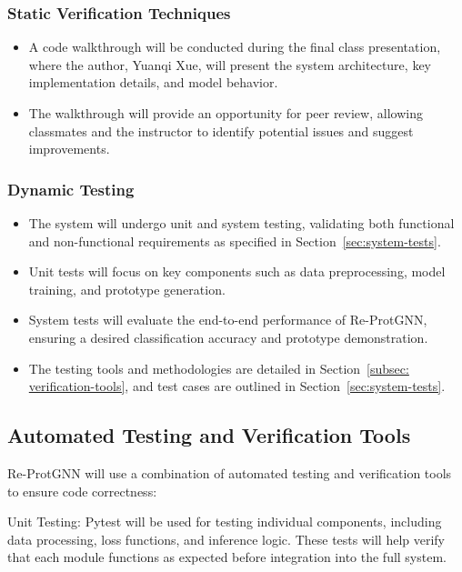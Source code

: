 \documentclass[12pt, titlepage]{article}
\begin{document}
\subsubsection{Static Verification Techniques} 
    \begin{itemize} 
    \item A code walkthrough will be conducted during the final class presentation, where the author, Yuanqi Xue, will present the system architecture, key implementation details, and model behavior.
    
    \item The walkthrough will provide an opportunity for peer review, allowing classmates and the instructor to identify potential issues and suggest improvements. 

\end{itemize}

\subsubsection{Dynamic Testing} 
\begin{itemize} 
    \item The system will undergo unit and system testing, validating both functional and non-functional requirements as specified in Section~\ref{sec:system-tests}. 
    \item Unit tests will focus on key components such as data preprocessing, model training, and prototype generation. 
    \item System tests will evaluate the end-to-end performance of Re-ProtGNN, ensuring a desired classification accuracy and prototype demonstration. 
    \item The testing tools and methodologies are detailed in Section~\ref{subsec: verification-tools}, and test cases are outlined in Section~\ref{sec:system-tests}. 
\end{itemize}


\subsection{Automated Testing and Verification Tools}
\label{sec:att}
\label{subsec: verification-tools}
Re-ProtGNN will use a combination of automated testing and verification tools to ensure code correctness:

Unit Testing:
Pytest will be used for testing individual components, including data processing, loss functions, and inference logic. These tests will help verify that each module functions as expected before integration into the full system.
\end{document}
